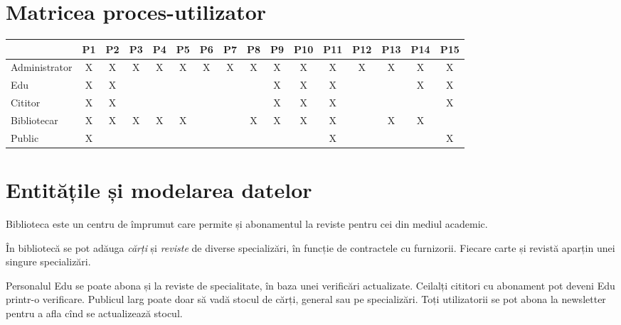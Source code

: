

\section{Matricea proces-utilizator}
\label{sec:matrice-pu}

\begin{center}
  \small
  \begin{tabular}{|l|c|c|c|c|c|c|c|c|c|c|c|c|c|c|c|}
    \hline
    & P1 & P2 & P3 & P4 & P5 & P6 & P7 & P8 & P9 & P10 & P11 & P12 & P13 & P14 & P15\\
    \hline \hline
    Administrator & X & X & X & X & X & X & X & X & X & X & X & X & X & X & X \\
    \hline
    Edu & X & X & & & & & & & X & X & X & & & X & X \\
    \hline
    Cititor & X & X & & & & & & & X & X & X & & & & X\\
    \hline
    Bibliotecar & X & X & X & X & X & & & X & X & X & X & & X & X & \\
    \hline
    Public & X & & & & & & & & & & X & & & & X \\
    \hline
  \end{tabular}
\end{center}


\section{Entitățile și modelarea datelor}
\label{sec:ent-model}

Biblioteca este un centru de împrumut care permite și abonamentul la reviste
pentru cei din mediul academic.

În bibliotecă se pot adăuga \emph{cărți} și \emph{reviste} de diverse
specializări, în funcție de contractele cu furnizorii. Fiecare
carte și revistă aparțin unei singure specializări.

Personalul Edu se poate abona și la reviste de specialitate, în baza
unei verificări actualizate. Ceilalți cititori cu abonament pot deveni
Edu printr-o verificare. Publicul larg poate doar să vadă stocul
de cărți, general sau pe specializări. Toți utilizatorii se pot abona
la newsletter pentru a afla cînd se actualizează stocul.

